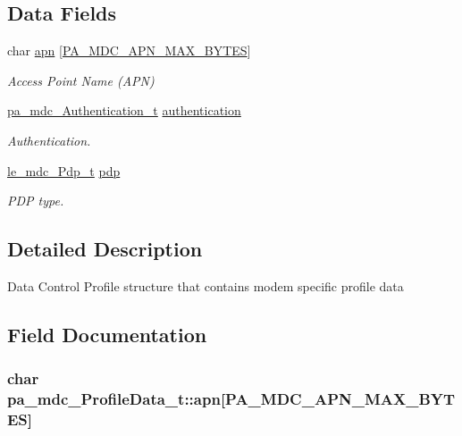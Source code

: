 \subsection*{Data Fields}
\begin{DoxyCompactItemize}
\item 
char \hyperlink{structpa__mdc___profile_data__t_a6953e5f8f5d52ea3834a5053164c0810}{apn} \mbox{[}\hyperlink{pa__mdc_8h_a1d502fe139e71614c1da3ce86b77845b}{P\+A\+\_\+\+M\+D\+C\+\_\+\+A\+P\+N\+\_\+\+M\+A\+X\+\_\+\+B\+Y\+T\+ES}\mbox{]}
\begin{DoxyCompactList}\small\item\em Access Point Name (A\+PN) \end{DoxyCompactList}\item 
\hyperlink{structpa__mdc___authentication__t}{pa\+\_\+mdc\+\_\+\+Authentication\+\_\+t} \hyperlink{structpa__mdc___profile_data__t_adc69a3abd177f26adf45468d401c6787}{authentication}
\begin{DoxyCompactList}\small\item\em Authentication. \end{DoxyCompactList}\item 
\hyperlink{le__mdc__interface_8h_a85721ec6046140c2f87c23f877dce247}{le\+\_\+mdc\+\_\+\+Pdp\+\_\+t} \hyperlink{structpa__mdc___profile_data__t_aba91d2e7bfc41d085211924e249564c3}{pdp}
\begin{DoxyCompactList}\small\item\em P\+DP type. \end{DoxyCompactList}\end{DoxyCompactItemize}


\subsection{Detailed Description}
Data Control Profile structure that contains modem specific profile data 

\subsection{Field Documentation}
\subsubsection[{\texorpdfstring{apn}{apn}}]{\setlength{\rightskip}{0pt plus 5cm}char pa\+\_\+mdc\+\_\+\+Profile\+Data\+\_\+t\+::apn\mbox{[}{\bf P\+A\+\_\+\+M\+D\+C\+\_\+\+A\+P\+N\+\_\+\+M\+A\+X\+\_\+\+B\+Y\+T\+ES}\mbox{]}}\hypertarget{structpa__mdc___profile_data__t_a6953e5f8f5d52ea3834a5053164c0810}{}\label{structpa__mdc___profile_data__t_a6953e5f8f5d52ea3834a5053164c0810}


